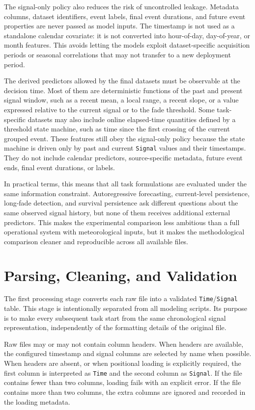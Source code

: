 The signal-only policy also reduces the risk of uncontrolled leakage. Metadata
columns, dataset identifiers, event labels, final event durations, and future
event properties are never passed as model inputs. The timestamp is not used as
a standalone calendar covariate: it is not converted into hour-of-day,
day-of-year, or month features. This avoids letting the models exploit
dataset-specific acquisition periods or seasonal correlations that may not
transfer to a new deployment period.

The derived predictors allowed by the final datasets must be observable at the
decision time. Most of them are deterministic functions of the past and present
signal window, such as a recent mean, a local range, a recent slope, or a value
expressed relative to the current signal or to the fade threshold. Some
task-specific datasets may also include online elapsed-time quantities defined
by a threshold state machine, such as time since the first crossing of the
current grouped event. These features still obey the signal-only policy because
the state machine is driven only by past and current \texttt{Signal} values and
their timestamps. They do not include calendar predictors, source-specific
metadata, future event ends, final event durations, or labels.

In practical terms, this means that all task formulations are evaluated under
the same information constraint. Autoregressive forecasting, current-level
persistence, long-fade detection, and survival persistence ask different
questions about the same observed signal history, but none of them receives
additional external predictors. This makes the experimental comparison less
ambitious than a full operational system with meteorological inputs, but it
makes the methodological comparison cleaner and reproducible across all
available files.

\section{Parsing, Cleaning, and Validation}

The first processing stage converts each raw file into a validated
\texttt{Time}/\texttt{Signal} table. This stage is intentionally separated
from all modeling scripts. Its purpose is to make every subsequent task start
from the same chronological signal representation, independently of the
formatting details of the original file.

Raw files may or may not contain column headers. When headers are available,
the configured timestamp and signal columns are selected by name when possible.
When headers are absent, or when positional loading is explicitly required, the
first column is interpreted as \texttt{Time} and the second column as
\texttt{Signal}. If the file contains fewer than two columns, loading fails
with an explicit error. If the file contains more than two columns, the extra
columns are ignored and recorded in the loading metadata.

